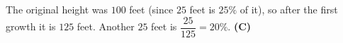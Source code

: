 The original height was $100$ feet (since $25$ feet is $25\%$ of it), so after the first growth it is $125$ feet. Another $25$ feet is $\dfrac{25}{125}=20\%$. \textbf{(C)}
